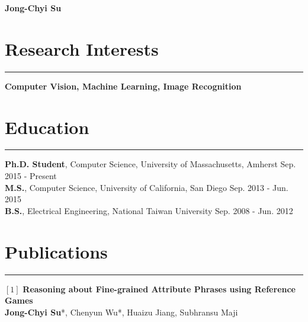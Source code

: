 \documentclass[10pt,letterpaper]{article}
\begin{document}
\thispagestyle{plain}
\begin{minipage}{0.60\textwidth}
\vspace{-40pt}
  \flushleft
{\bfseries\Huge Jong-Chyi Su}
\vspace{-0.8em}
\end{minipage}
\hfill
\begin{minipage}[ht]{0.38\textwidth}
\vspace{-25pt}
\end{minipage}
\vspace{-10pt}
\section*{Research Interests}\vspace{-8pt}
\hrule \vspace{10pt}
\textbf{Computer Vision, Machine Learning, Image Recognition}
\vspace{-3pt}

\section*{Education}\vspace{-8pt}
\hrule \vspace{10pt}
\textbf{Ph.D. Student}, Computer Science, University of Massachusetts, Amherst \hfill Sep. 2015 - Present\vspace{2pt}\\
\textbf{M.S.}, Computer Science, University of California, San Diego \hfill Sep. 2013 - Jun. 2015\vspace{2pt}\\
\textbf{B.S.}, Electrical Engineering, National Taiwan University \hfill Sep. 2008 - Jun. 2012
\vspace{-3pt}

\setlength\parindent{14pt}
\section*{Publications} \vspace{-8pt}

\hrule \vspace{10pt}
$[1]$ {\bf Reasoning about Fine-grained Attribute Phrases using Reference Games}\\
\indent \textbf{Jong-Chyi Su}*, Chenyun Wu*, Huaizu Jiang, Subhransu Maji \\
\end{document}
